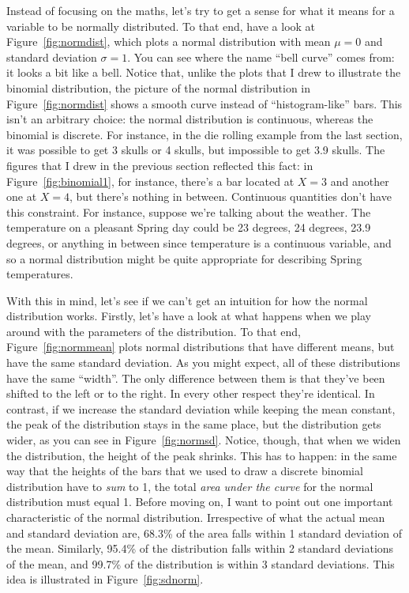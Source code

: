 Instead of focusing on the maths, let's try to get a sense for what it means for a variable to be normally distributed. To that end, have a look at Figure~\ref{fig:normdist}, which plots a normal distribution with mean $\mu = 0$ and standard deviation $\sigma = 1$. You can see where the name ``bell curve'' comes from: it looks a bit like a bell. Notice that, unlike the plots that I drew to illustrate the binomial distribution, the picture of the normal distribution in Figure~\ref{fig:normdist} shows a smooth curve instead of ``histogram-like'' bars. This isn't an arbitrary choice: the normal distribution is continuous, whereas the binomial is discrete. For instance, in the die rolling example from the last section, it was possible to get 3 skulls or 4 skulls, but impossible to get 3.9 skulls. The figures that I drew in the previous section reflected this fact: in Figure~\ref{fig:binomial1}, for instance, there's a bar located at $X=3$ and another one at $X=4$, but there's nothing in between. Continuous quantities don't have this constraint. For instance, suppose we're talking about the weather. The temperature on a pleasant Spring day could be 23 degrees, 24 degrees, 23.9 degrees, or anything in between since temperature is a continuous variable, and so a normal distribution might be quite appropriate for describing Spring temperatures. 

With this in mind, let's see if we can't get an intuition for how the normal distribution works. Firstly, let's have a look at what happens when we play around with the parameters of the distribution. To that end, Figure~\ref{fig:normmean} plots normal distributions that have different means, but have the same standard deviation. As you might expect, all of these distributions have the same ``width''. The only difference between them is that they've been shifted to the left or to the right. In every other respect they're identical. In contrast, if we increase the standard deviation while keeping the mean constant, the peak of the distribution stays in the same place, but the distribution gets wider, as you can see in Figure~\ref{fig:normsd}. Notice, though, that when we widen the distribution, the height of the peak shrinks. This has to happen: in the same way that the heights of the bars that we used to draw a discrete binomial distribution have to {\it sum} to 1, the total {\it area under the curve} for the normal distribution must equal 1. Before moving on, I want to point out one important characteristic of the normal distribution. Irrespective of what the actual mean and standard deviation are, 68.3\% of the area falls within 1 standard deviation of the mean. Similarly, 95.4\% of the distribution falls within 2 standard deviations of the mean, and 99.7\% of the distribution is within 3 standard deviations. This idea is illustrated in Figure~\ref{fig:sdnorm}.

